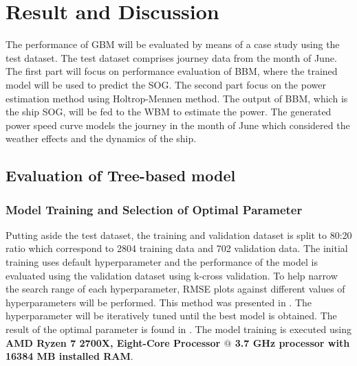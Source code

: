 \chapter{Result and Discussion} \label{chp:result}

The performance of GBM will be evaluated by means of a case study using the test dataset. The test dataset comprises journey data from the month of June. The first part will focus on performance evaluation of BBM, where the trained model will be used to predict the SOG. The second part focus on the power estimation method using Holtrop-Mennen method. The output of BBM, which is the ship SOG, will be fed to the WBM to estimate the power. The generated power speed curve models the journey in the month of June which considered the weather effects and the dynamics of the ship.

\section{Evaluation of Tree-based model}\label{sec:BBM_tree_evaluate}

\subsection*{Model Training and Selection of Optimal Parameter}\label{sec:hpo_select_train}

Putting aside the test dataset, the training and validation dataset is split to 80:20 ratio which correspond to 2804 training data and 702 validation data. The initial training uses default hyperparameter and the performance of the model is evaluated using the validation dataset using k-cross validation. To help narrow the search range of each hyperparameter, RMSE plots against different values of hyperparameters will be performed. This method was presented in . The hyperparameter will be iteratively tuned until the best model is obtained. The result of the optimal parameter is found in . The model training is executed using \textbf{AMD Ryzen 7 2700X, Eight-Core Processor $@$ 3.7 GHz processor with 16384 MB installed RAM}.\\


